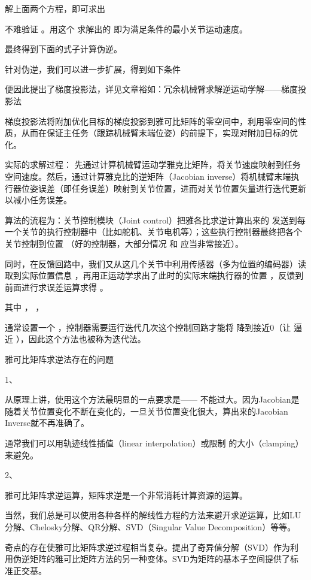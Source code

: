 解上面两个方程，即可求出


不难验证 
 。用这个 
 求解出的 
 即为满足条件的最小关节运动速度。

最终得到下面的式子计算伪逆。


针对伪逆，我们可以进一步扩展，得到如下条件


便因此提出了梯度投影法，详见文章裕如：冗余机械臂求解逆运动学解——梯度投影法

梯度投影法将附加优化目标的梯度投影到雅可比矩阵的零空间中，利用零空间的性质，从而在保证主任务（跟踪机械臂末端位姿）的前提下，实现对附加目标的优化。



实际的求解过程：
先通过计算机械臂运动学雅克比矩阵，将关节速度映射到任务空间速度。然后，通过计算雅克比的逆矩阵（Jacobian inverse）将机械臂末端执行器位姿误差（即任务误差）映射到关节位置，进而对关节位置矢量进行迭代更新以减小任务误差。


算法的流程为：关节控制模块（Joint control）把雅各比求逆计算出来的 
 发送到每一个关节的执行控制器中（比如舵机、关节电机等）；这些执行控制器最终把各个关节控制到位置 
 （好的控制器，大部分情况 
 和 
 应当非常接近）。

同时，在反馈回路中，我们又从这几个关节中利用传感器（多为位置的编码器）读取到实际位置信息 
 ，再用正运动学求出了此时的实际末端执行器的位置 
 ，反馈到前面进行求误差运算求得 
 。

其中 
 ， 
 ， 

通常设置一个 
 ，控制器需要运行迭代几次这个控制回路才能将 
 降到接近0（让 
 逼近 
 ），因此这个方法也被称为迭代法。





雅可比矩阵求逆法存在的问题

1、

从原理上讲，使用这个方法最明显的一点要求是—— 
 不能过大。因为Jacobian是随着关节位置变化不断在变化的，一旦关节位置变化很大，算出来的Jacobian Inverse就不再准确了。

通常我们可以用轨迹线性插值（linear interpolation）或限制 
 的大小（clamping）来避免。

2、

雅可比矩阵求逆运算，矩阵求逆是一个非常消耗计算资源的运算。

当然，我们总是可以使用各种各样的解线性方程的方法来避开求逆运算，比如LU分解、Chelosky分解、QR分解、SVD（Singular Value Decomposition）等等。

奇点的存在使雅可比矩阵求逆过程相当复杂。提出了奇异值分解（SVD）作为利用伪逆矩阵的雅可比矩阵方法的另一种变体。SVD为矩阵的基本子空间提供了标准正交基。

